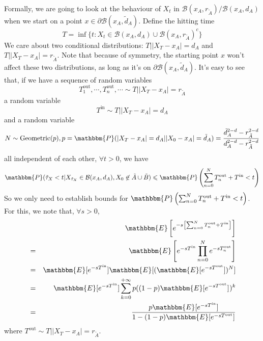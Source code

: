 \documentclass[english, aip, jcp, priprint, graphicx]{revtex4-1}
\newcommand{\nin}{\not\in}
\newcommand{\tmop}[1]{\ensuremath{\operatorname{#1}}}
\theoremstyle{plain}
\theoremstyle{definition}
\theoremstyle{plain}
\begin{document}
Formally, we are going to look at the behaviour of $X_t$ in $\mathcal{B} (x_A,
r_{\tilde{A}}) / \mathcal{B} (x_A, d_A)$ when we start on a point $x \in
\partial \mathcal{B} (x_A, \tilde{d}_A)$. Define the hitting time
\[ T = \inf \{ t : X_t \in \mathcal{B} (x_A, d_A) \cup \mathcal{B} (x_A,
r_{\tilde{A}})^c \} \]
We care about two conditional distributions: $T| | X_T - x_A | = d_A$ and $T|
| X_T - x_A | = r_{\tilde{A}}$. Note that because of symmetry, the starting
point $x$ won't affect these two distributions, as long as it's on $\partial
\mathcal{B} (x_A, \tilde{d}_A)$. It's easy to see that, if we have a sequence
of random variables
\[ T^{\tmop{out}}_1, \cdots, T^{\tmop{out}}_n, \cdots \sim T| | X_T - x_A | =
r_{\tilde{A}} \]
a random variable
\[ T^{\tmop{in}} \sim T| | X_T - x_A | = d_A \]
and a random variable
\[ N \sim \tmop{Geometric} (p), p =\mathbbm{P} (| X_T - x_A | = d_A | | X_0 -
x_A | = \tilde{d}_A) = \frac{\tilde{d}_A^{2 - d} - r_{\tilde{A}}^{2 -
d}}{d_A^{2 - d} - r_{\tilde{A}}^{2 - d}} \]
all independent of each other, $\forall t > 0$, we have
\[ \mathbbm{P} (\tilde{\tau}_X < t|X_{\tilde{\tau}_X} \in \mathcal{B} (x_A,
d_A), X_0 \nin \tilde{A} \cup \tilde{B}) \leqslant \mathbbm{P} \left(
\sum_{n = 0}^N T_n^{\tmop{out}} + T^{\tmop{in}} < t \right) \]
So we only need to establish bounds for $\mathbbm{P} \left( \sum_{n = 0}^N
T_n^{\tmop{out}} + T^{\tmop{in}} < t \right)$. For this, we note that,
$\forall s > 0$,
\begin{eqnarray*}
&  & \mathbbm{E} \left[ e^{- s \left[ \sum_{n = 0}^N T_n^{\tmop{out}} +
T^{\tmop{in}} \right]} \right]\\
& = & \mathbbm{E} \left[ e^{- sT^{\tmop{in}}} \prod_{n = 0}^N e^{-
sT_n^{\tmop{out}}} \right]\\
& = & \mathbbm{E} [e^{- sT^{\tmop{in}}}] \mathbbm{E} [(\mathbbm{E} [e^{-
sT^{\tmop{out}}}])^N]\\
& = & \mathbbm{E} [e^{- sT^{\tmop{in}}}] \sum_{k = 0}^{+ \infty} p ((1 - p)
\mathbbm{E} [e^{- sT^{\tmop{out}}}]^{})^k\\
& = & \frac{p\mathbbm{E} [e^{- sT^{\tmop{in}}}]}{1 - (1 - p) \mathbbm{E}
[e^{- sT^{\tmop{out}}}]}
\end{eqnarray*}
where $T^{\tmop{out}} \sim T| | X_T - x_A | = r_{\tilde{A}}$.
\end{document}
